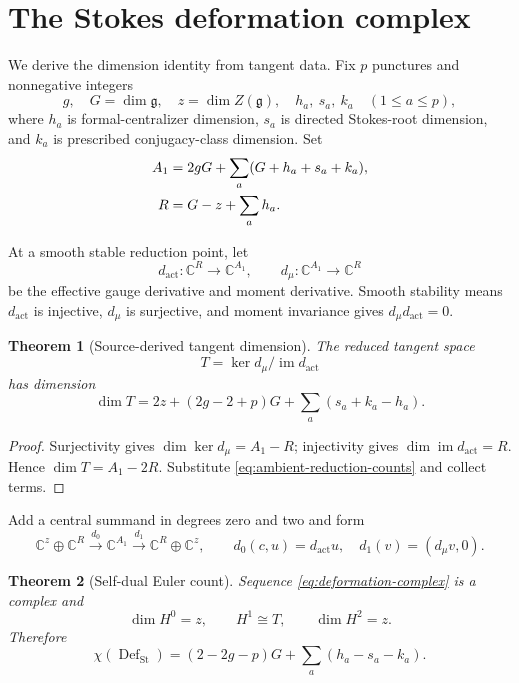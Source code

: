 \documentclass[11pt,a4paper]{amsart}
\theoremstyle{plain}
\newtheorem{theorem}{Theorem}[section]
\theoremstyle{definition}
\newcommand{\CC}{\mathbb C}
\newcommand{\im}{\operatorname{im}}
\newcommand{\Def}{\operatorname{Def}}
\begin{document}
\section{The Stokes deformation complex}\label{sec:deformation}

We derive the dimension identity from tangent data.  Fix $p$ punctures and nonnegative integers
\[
 g,\quad G=\dim\mathfrak g,\quad z=\dim Z(\mathfrak g),\quad
 h_a,\ s_a,\ k_a\quad(1\leq a\leq p),
\]
where $h_a$ is formal-centralizer dimension, $s_a$ is directed Stokes-root dimension, and $k_a$
is prescribed conjugacy-class dimension.  Set
\begin{align}\label{eq:ambient-reduction-counts}
 A_1&=2gG+\sum_a(G+h_a+s_a+k_a),\\
 R&=G-z+\sum_ah_a.\notag
\end{align}

At a smooth stable reduction point, let
\[
 d_{\mathrm{act}}:\CC^R\longrightarrow\CC^{A_1},\qquad
 d_\mu:\CC^{A_1}\longrightarrow\CC^R
\]
be the effective gauge derivative and moment derivative.  Smooth stability means
$d_{\mathrm{act}}$ is injective, $d_\mu$ is surjective, and moment invariance gives
$d_\mu d_{\mathrm{act}}=0$.

\begin{theorem}[Source-derived tangent dimension]\label{thm:tangent-dimension}
The reduced tangent space
\[
                         T=\ker d_\mu/\im d_{\mathrm{act}}
\]
has dimension
\begin{equation}\label{eq:tangent-dimension}
 \boxed{
 \dim T=2z+(2g-2+p)G+\sum_a(s_a+k_a-h_a).}                  \tag{D}
\end{equation}
\end{theorem}

\begin{proof}
Surjectivity gives $\dim\ker d_\mu=A_1-R$; injectivity gives
$\dim\im d_{\mathrm{act}}=R$.  Hence $\dim T=A_1-2R$.  Substitute
\eqref{eq:ambient-reduction-counts} and collect terms.
\end{proof}

Add a central summand in degrees zero and two and form
\begin{equation}\label{eq:deformation-complex}
 \CC^z\oplus\CC^R\xrightarrow{d_0}\CC^{A_1}
 \xrightarrow{d_1}\CC^R\oplus\CC^z,
 \qquad
 d_0(c,u)=d_{\mathrm{act}}u,\quad d_1(v)=(d_\mu v,0).
\end{equation}

\begin{theorem}[Self-dual Euler count]\label{thm:deformation-euler}
Sequence \eqref{eq:deformation-complex} is a complex and
\[
 \dim H^0=z,\qquad H^1\cong T,\qquad \dim H^2=z.
\]
Therefore
\begin{equation}\label{eq:deformation-euler}
 \boxed{
 \chi(\Def_{\mathrm{St}})=(2-2g-p)G+\sum_a(h_a-s_a-k_a).}    \tag{E}
\end{equation}
\end{theorem}
\end{document}
